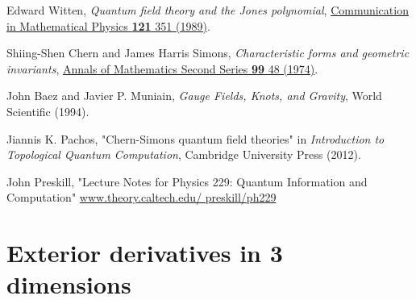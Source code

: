 \documentclass[aps,nofootinbib]{revtex4}
\begin{document}
\begin{thebibliography}{99}

Edward Witten, \emph{Quantum field theory and the Jones polynomial}, \href{http://link.springer.com/article/10.1007/BF01217730}{Communication in Mathematical Physics {\bf 121} 351 (1989)}.

Shiing-Shen Chern and James Harris Simons, \emph{Characteristic forms and geometric invariants}, \href{https://www.jstor.org/stable/1971013}{Annals of Mathematics
Second Series {\bf 99} 48 (1974)}.

John Baez and Javier P. Muniain, \emph{Gauge Fields, Knots, and Gravity}, World Scientific (1994).


Jiannis K. Pachos, "Chern-Simons quantum field theories" in \emph{Introduction to Topological Quantum Computation}, Cambridge University Press (2012).

John Preskill, "Lecture Notes for Physics 229: Quantum Information and Computation" \href{http://www.theory.caltech.edu/ preskill/ph229}{www.theory.caltech.edu/ preskill/ph229}


\end{thebibliography}

\appendix

\section{Exterior derivatives in 3 dimensions}\label{appendix}
\end{document}
